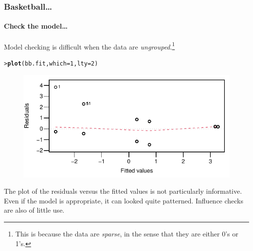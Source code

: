 \documentclass{beamer}\usepackage[]{graphicx}\usepackage[]{xcolor}
\makeatletter
\newcommand{\hlnum}[1]{\textcolor[rgb]{0.686,0.059,0.569}{#1}}%
\newcommand{\hlstd}[1]{\textcolor[rgb]{0.345,0.345,0.345}{#1}}%
\newcommand{\hlkwc}[1]{\textcolor[rgb]{0.333,0.667,0.333}{#1}}%
\newcommand{\hlkwd}[1]{\textcolor[rgb]{0.737,0.353,0.396}{\textbf{#1}}}%
\newenvironment{kframe}{%
 \def\at@end@of@kframe{}%
 \ifinner\ifhmode%
  \def\at@end@of@kframe{\end{minipage}}%
  \begin{minipage}{\columnwidth}%
 \fi\fi%
 \def\FrameCommand##1{\hskip\@totalleftmargin \hskip-\fboxsep
 \colorbox{shadecolor}{##1}\hskip-\fboxsep
     \hskip-\linewidth \hskip-\@totalleftmargin \hskip\columnwidth}%
 \MakeFramed {\advance\hsize-\width
   \@totalleftmargin\z@ \linewidth\hsize
   \@setminipage}}%
 {\par\unskip\endMakeFramed%
 \at@end@of@kframe}
\newenvironment{knitrout}{}{} %
\makeatother
\begin{document}
\begin{frame}[fragile]
\frametitle{Basketball\ldots}
\framesubtitle{Check the model\ldots}
Model checking is difficult when the data are \emph{ungrouped}.\footnote{This is because the data are {\em sparse}, in the sense that they are either 0's or 1's.}

\begin{knitrout}\scriptsize
{}\color{fgcolor}\begin{kframe}
\begin{alltt}
\hlstd{> }\hlkwd{plot}\hlstd{(bb.fit,} \hlkwc{which} \hlstd{=} \hlnum{1}\hlstd{,} \hlkwc{lty}\hlstd{=}\hlnum{2}\hlstd{)}
\end{alltt}
\end{kframe}
\end{knitrout}

\begin{figure}
  \centering
  \includegraphics[scale=0.8]{figure/RC-H15-006}
\end{figure}

The plot of the residuals versus the fitted values is not particularly informative. Even if the model is appropriate, it can looked quite patterned. Influence checks are also of little use.
\end{frame}
\end{document}
